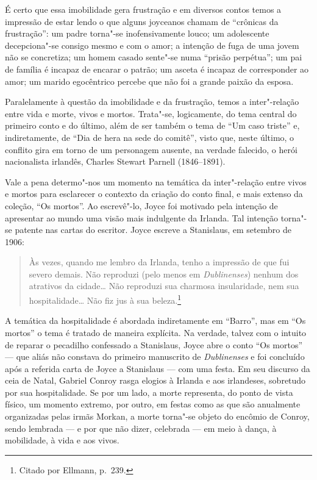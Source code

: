 {É certo que essa imobilidade gera frustração e em diversos contos temos a
impressão de estar lendo o que alguns joyceanos chamam de “crônicas da
frustração”: um padre torna"-se inofensivamente louco; um adolescente
decepciona"-se consigo mesmo e com o amor; a intenção de fuga de uma jovem não
se concretiza; um homem casado sente"-se numa “prisão perpétua”; um pai de
família é incapaz de encarar o patrão; um asceta é incapaz de corresponder ao
amor; um marido egocêntrico percebe que não foi a grande paixão da esposa.

Paralelamente à questão da imobilidade e da frustração, temos a inter"-relação
entre vida e morte, vivos e mortos. Trata"-se, logicamente, do tema central do
primeiro conto e do último, além de ser também o tema de “Um caso triste” e,
indiretamente, de “Dia de hera na sede do comitê”, visto que, neste último, o
conflito gira em torno de um personagem ausente, na verdade falecido, o herói
nacionalista irlandês, Charles Stewart Parnell (1846--1891).

Vale a pena determo"-nos um momento na temática da inter"-relação entre vivos e
mortos para esclarecer o contexto da criação do conto final, e mais extenso da
coleção, “Os mortos”. Ao escrevê"-lo, Joyce foi motivado pela intenção
de apresentar ao mundo uma visão mais indulgente da Irlanda. Tal intenção
torna"-se patente nas cartas do escritor. Joyce escreve a Stanislaus, em
setembro de 1906: 

\begin{quote}
Às vezes, quando me lembro da Irlanda, tenho a impressão de
que fui severo demais. Não reproduzi (pelo menos em \textit{Dublinenses}) nenhum
dos atrativos da cidade\ldots{} Não reproduzi sua charmosa insularidade, nem sua
hospitalidade\ldots{} Não fiz jus à sua beleza.\footnote{ Citado por Ellmann, p.~239.}
\end{quote}

A temática da hospitalidade é abordada indiretamente em “Barro”, mas em “Os
mortos” o tema é tratado de maneira explícita. Na verdade, talvez com o intuito
de reparar o pecadilho confessado a Stanislaus, Joyce abre o conto “Os mortos”
--- que aliás não constava do primeiro manuscrito de \textit{Dublinenses} e
foi concluído após a referida carta de Joyce a Stanislaus --- com uma festa.
Em seu discurso da ceia de Natal, Gabriel Conroy rasga elogios à Irlanda e aos
irlandeses, sobretudo por sua hospitalidade. Se por um lado, a morte
representa, do ponto de vista físico, um momento extremo, por outro, em festas
como as que são anualmente organizadas pelas irmãs Morkan, a morte torna"-se
objeto do encômio de Conroy, sendo lembrada --- e por que não dizer, celebrada ---
em meio à dança, à mobilidade, à vida e aos vivos.

}
